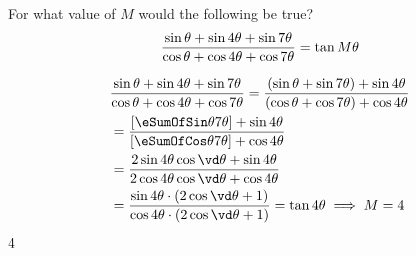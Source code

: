
\SUBTRACT\vb\va\vd

\question[3] For what value of $M$ would the following be true? 
 \[ \dfrac{\sin\theta + \sin 4\theta + \sin 7\theta}
  	{\cos \theta + \cos 4\theta + \cos 7\theta} = \tan M\theta \]

\watchout 

\begin{solution}[\halfpage]
  \begin{align}
    &\dfrac{\sin\theta + \sin\va\theta + \sin\vb\theta}{\cos\theta + \cos\va\theta + \cos\vb\theta} = 
    \dfrac{(\sin\theta + \sin\vb\theta) + \sin\va\theta}{(\cos\theta + \cos\vb\theta) + \cos\va\theta} \\
    &= \dfrac{\left[ \eSumOfSin\theta{\vb\theta} \right] + \sin\va\theta}{\left[ \eSumOfCos\theta{\vb\theta}\right] + \cos\va\theta} \\
    &= \dfrac{2\sin\va\theta\cos\vd\theta + \sin\va\theta}{2\cos\va\theta\cos\vd\theta + \cos\va\theta} \\
    &= \dfrac{\sin\va\theta\cdot (2\cos\vd\theta + 1)}{\cos\va\theta\cdot (2\cos\vd\theta + 1)} = \tan\va\theta\implies M = \va
  \end{align}
\end{solution}

\ifprintanswers\begin{codex}$4$\end{codex}\fi
